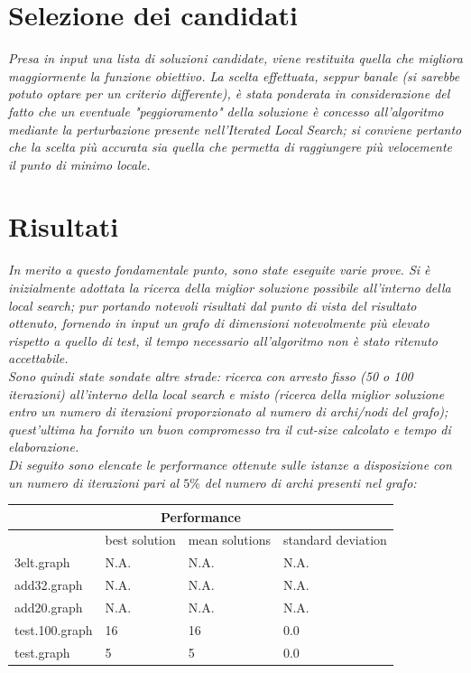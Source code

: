 \documentclass[12pt,titlepage,oneside]{article}
\begin{document}
\section{Selezione dei candidati}
\textit{Presa in input una lista di soluzioni candidate, viene restituita quella che migliora maggiormente la funzione obiettivo. La scelta effettuata, seppur banale (si sarebbe potuto optare per un criterio differente), è stata ponderata in considerazione del fatto che un eventuale "peggioramento" della soluzione è concesso all'algoritmo mediante la perturbazione presente nell'Iterated Local Search; si conviene pertanto che la scelta più accurata sia quella che permetta di raggiungere più velocemente il punto di minimo locale.}

\clearpage
\section{Risultati}
\textit{In merito a questo fondamentale punto, sono state eseguite varie prove.
Si è inizialmente adottata la ricerca della miglior soluzione possibile all'interno della local search; pur portando notevoli risultati dal punto di vista del risultato ottenuto, fornendo in input un grafo di dimensioni notevolmente più elevato rispetto a quello di test, il tempo necessario all'algoritmo non è stato ritenuto accettabile.\\
Sono quindi state sondate altre strade: ricerca con arresto fisso (50 o 100 iterazioni) all'interno della local search e misto (ricerca della miglior soluzione entro un numero di iterazioni proporzionato al numero di archi/nodi del grafo); quest'ultima ha fornito un buon compromesso tra il cut-size calcolato e tempo di elaborazione.\\
Di seguito sono elencate le performance ottenute sulle istanze a disposizione con un numero di iterazioni pari al $5\%$ del numero di archi presenti nel grafo:}
\begin{table}[ht!]
\begin{tabular}{ |p{3.5cm}||p{3.5cm}|p{3.5cm}|p{3.5cm}|  }
 \hline
 \multicolumn{4}{|c|}{Performance}\\
 \hline
  & best solution & mean solutions & standard deviation\\
 \hline
 3elt.graph & N.A. & N.A. & N.A.\\
 add32.graph & N.A. & N.A. & N.A.\\
 add20.graph & N.A. & N.A. & N.A.\\
 test.100.graph & 16 & 16 & 0.0\\
 test.graph & 5 & 5 & 0.0\\
 \hline
\end{tabular}
\end{table}
\end{document}
